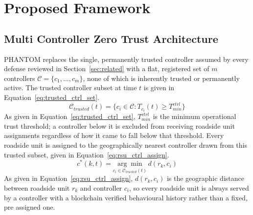 \documentclass[final,5p,twocolumn]{elsarticle}
\theoremstyle{remark}
\theoremstyle{plain}
\begin{document}
\section{Proposed Framework}
\label{sec:framework}

\subsection{Multi Controller Zero Trust Architecture}
\label{sec:ctrl_trust}

PHANTOM replaces the single, permanently trusted controller assumed by every
defense reviewed in Section~\ref{sec:related} with a flat, registered set of
$m$ controllers $\mathcal{C} = \{c_1, \ldots, c_m\}$, none of which is
inherently trusted or permanently active. The trusted controller subset at
time $t$ is given in Equation~\eqref{eq:trusted_ctrl_set}.
\begin{equation}
	\mathcal{C}_{trusted}(t) = \{c_i \in \mathcal{C} : T_{c_i}(t) \geq T_{min}^{ctrl}\}
	\label{eq:trusted_ctrl_set}
\end{equation}
As given in Equation~\eqref{eq:trusted_ctrl_set}, $T_{min}^{ctrl}$ is the
minimum operational trust threshold; a controller below it is excluded from
receiving roadside unit assignments regardless of how it came to fall below
that threshold. Every roadside unit is assigned to the geographically nearest
controller drawn from this trusted subset, given in
Equation~\eqref{eq:rsu_ctrl_assign}.
\begin{equation}
	c^*(k,t) = \underset{c_i \in \mathcal{C}_{trusted}(t)}{\arg\min}\, d(r_k, c_i)
	\label{eq:rsu_ctrl_assign}
\end{equation}
As given in Equation~\eqref{eq:rsu_ctrl_assign}, $d(r_k,c_i)$ is the
geographic distance between roadside unit $r_k$ and controller $c_i$, so
every roadside unit is always served by a controller with a blockchain
verified behavioural history rather than a fixed, pre assigned one.
\end{document}
